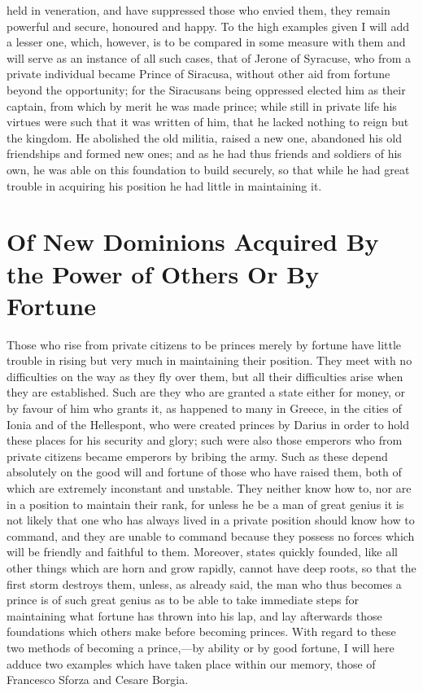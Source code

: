 \documentclass[12pt,letterpaper]{memoir}
\begin{document}
held in veneration, and have suppressed those who envied them, they
remain powerful and secure, honoured and happy. To the high examples
given I will add a lesser one, which, however, is to be compared in
some measure with them and will serve as an instance of all such cases,
that of Jerone of Syracuse, who from a private individual became Prince
of Siracusa, without other aid from fortune beyond the opportunity;
for the Siracusans being oppressed elected him as their captain, from
which by merit he was made prince; while still in private life his
virtues were such that it was written of him, that he lacked nothing
to reign but the kingdom. He abolished the old militia, raised a new
one, abandoned his old friendships and formed new ones; and as he had
thus friends and soldiers of his own, he was able on this foundation
to build securely, so that while he had great trouble in acquiring his
position he had little in maintaining it.

\chapter{Of New Dominions Acquired By the Power of Others Or By Fortune}

Those who rise from private citizens to be princes merely by fortune
have little trouble in rising but very much in maintaining their
position. They meet with no difficulties on the way as they fly over
them, but all their difficulties arise when they are established. Such
are they who are granted a state either for money, or by favour of him
who grants it, as happened to many in Greece, in the cities of Ionia
and of the Hellespont, who were created princes by Darius in order to
hold these places for his security and glory; such were also those
emperors who from private citizens became emperors by bribing the
army. Such as these depend absolutely on the good will and fortune of
those who have raised them, both of which are extremely inconstant and
unstable. They neither know how to, nor are in a position to maintain
their rank, for unless he be a man of great genius it is not likely
that one who has always lived in a private position should know how to
command, and they are unable to command because they possess no forces
which will be friendly and faithful to them. Moreover, states quickly
founded, like all other things which are horn and grow rapidly, cannot
have deep roots, so that the first storm destroys them, unless, as
already said, the man who thus becomes a prince is of such great genius
as to be able to take immediate steps for maintaining what fortune
has thrown into his lap, and lay afterwards those foundations which
others make before becoming princes. With regard to these two methods
of becoming a prince,---by ability or by good fortune, I will here
adduce two examples which have taken place within our memory, those of
Francesco Sforza and Cesare Borgia.
\end{document}
